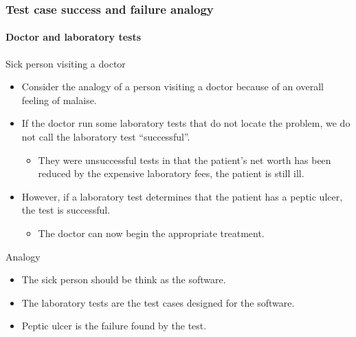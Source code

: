 \begin{frame}[hasprev=false, hasnext=false]
\frametitle{Test case success and failure analogy}
\framesubtitle{Doctor and laboratory tests}
\label{example:doctor-laboratory-test}

\begin{block}{Sick person visiting a doctor}
\begin{itemize}
	\item Consider the analogy of a person visiting a doctor because of an
	overall feeling of malaise.

	\item If the doctor run some laboratory tests that do not locate the
	problem, we do not call the laboratory test ``successful''.
	\begin{itemize}
		\item They were unsuccessful tests in that the patient's net worth has
		been reduced by the expensive laboratory fees, the patient is still
		ill.
	\end{itemize}

	\item However, if a laboratory test determines that the patient has a
	peptic ulcer, the test is successful.
	\begin{itemize}
		\item The doctor can now begin the appropriate treatment.
	\end{itemize}
\end{itemize}
\end{block}

\begin{block}{Analogy}
\begin{itemize}
	\item The sick person should be think as the software.

	\item The laboratory tests are the test cases designed for the software.

	\item Peptic ulcer is the failure found by the test.
\end{itemize}
\end{block}
\end{frame}
